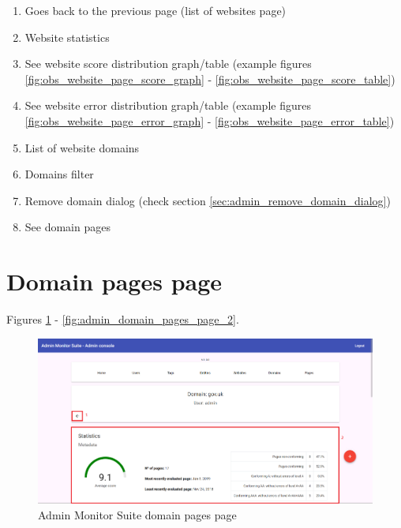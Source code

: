 \begin{enumerate}
    \item Goes back to the previous page (list of websites page)
    \item Website statistics
    \item See website score distribution graph/table (example figures \ref{fig:obs_website_page_score_graph} - \ref{fig:obs_website_page_score_table})
    \item See website error distribution graph/table (example figures \ref{fig:obs_website_page_error_graph} - \ref{fig:obs_website_page_error_table})
    \item List of website domains
    \item Domains filter
    \item Remove domain dialog (check section \ref{sec:admin_remove_domain_dialog})
    \item See domain pages
\end{enumerate}

\section{Domain pages page}

Figures \ref{fig:admin_domain_pages_page} - \ref{fig:admin_domain_pages_page_2}.

\begin{figure}[H]
    \centering
    \includegraphics[width=\linewidth]{lib/images/admin/admin_domain_pages_page.png}
    \caption{Admin Monitor Suite domain pages page}
    \label{fig:admin_domain_pages_page}
\end{figure}

\clearpage

